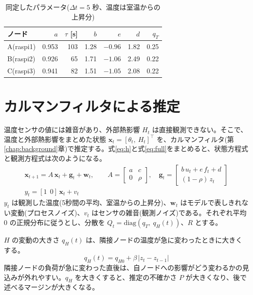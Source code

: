 \begin{table}[tb]
  \centering
  \caption{同定したパラメータ($\Delta t = 5$ 秒、温度は室温からの上昇分)}
  \label{tab:params}
  \begin{tabular}{lrrrrrr}
    \toprule
    ノード & $a$ & $\tau$ [s] & $b$ & $e$ & $d$ & $q_T$ \\
    \midrule
    A(raspi1) & 0.953 & 103 & 1.28 & $-0.96$ & 1.82 & 0.25 \\
    B(raspi2) & 0.926 & 65 & 1.71 & $-1.06$ & 2.49 & 0.22 \\
    C(raspi3) & 0.941 & 82 & 1.51 & $-1.05$ & 2.08 & 0.22 \\
    \bottomrule
  \end{tabular}
\end{table}

\section{カルマンフィルタによる推定}\label{sec:method-kf}
温度センサの値には雑音があり、外部熱影響 $H_t$ は直接観測できない。そこで、温度と外部熱影響をまとめた状態 $\bm{x}_t = [\theta_t,\ H_t]^\top$ を、カルマンフィルタ(第\ref{chap:background}章)で推定する。式\eqref{eq:h}と式\eqref{eq:full}をまとめると、状態方程式と観測方程式は次のようになる。
\begin{gather}
  \bm{x}_{t+1} = A\,\bm{x}_t + \bm{g}_t + \bm{w}_t,\qquad
  A = \begin{bmatrix} a & c \\ 0 & \rho \end{bmatrix},\quad
  \bm{g}_t = \begin{bmatrix} b\,u_t + e\,f_t + d \\ (1-\rho)\,z_t \end{bmatrix}
  \label{eq:state}\\
  y_t = [1\ \ 0]\,\bm{x}_t + v_t
  \label{eq:obs}
\end{gather}
$y_t$ は観測した温度(5秒間の平均、室温からの上昇分)、$\bm{w}_t$ はモデルで表しきれない変動(プロセスノイズ)、$v_t$ はセンサの雑音(観測ノイズ)である。それぞれ平均 0 の正規分布に従うとし、分散を $Q_t = \mathrm{diag}(q_T,\ q_H(t))$、$R$ とする。

$H$ の変動の大きさ $q_H(t)$ は、隣接ノードの温度が急に変わったときに大きくする。
\begin{equation}
  q_H(t) = q_{H0} + \beta\,|z_t - z_{t-1}|
  \label{eq:adaptive-q}
\end{equation}
隣接ノードの負荷が急に変わった直後は、自ノードへの影響がどう変わるかの見込みが外れやすい。$q_H$ を大きくすると、推定の不確かさ $P$ が大きくなり、後で述べるマージンが大きくなる。

